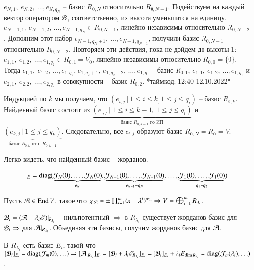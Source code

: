 \documentclass[main]{subfiles}
\begin{document}
$e_{N, 1}, \ e_{N, 2}, \ \ldots, e_{N, q_N}$ -- базис $R_{0, N}$ относительно $R_{0, N-1}$.
Подействуем на каждый вектор оператором $\mathcal{B}$, соответственно, их высота уменьшится на единицу.
$e_{N-1, 1}, \ e_{N-1, 2}, \ \ldots, e_{N-1, q_N} \in R_{0, N-1}$, линейно независимы относительно $ R_{0, N-2}$.
Дополним этот набор $e_{N-1, q_N+1}, \ \ldots, e_{N-1, q_{N-1}}$, получили базис  $R_{0, N-1}$ относительно $R_{0, N-2}$. Повторяем эти действия, пока не дойдем до высоты 1:
$e_{1, 1}, \ e_{1, 2}, \ \ldots, e_{1, q_2} \in R_{0, 1} = V_0$, линейно независимы относительно $ R_{0, 0} = \{0\}$.
Тогда $e_{1, 1}, \ e_{1, 2}, \ \ldots, e_{1, q_2}$, $e_{1, q_2+1}, \ e_{1, q_2+2}, \ \ldots, e_{1, q_1}$ -- базис $R_{0, 1}$,
$e_{1, 1}, \ e_{1, 2}, \ \ldots, e_{1, q_1}$ и $e_{2, 1}, \ e_{2, 2}, \ \ldots, e_{2, q_2}$ в совокупности -- базис $R_{0, 2}$. *таймкод: 12:40 12.10.2022*

Индукцией по $k$ мы получаем, что $(e_{i,j} \  | \ 1 \leq i \leq k_, \ 1 \leq j \leq q_i)$ -- базис $R_{0, k}$.
Найденный базис состоит из $\underbrace{(e_{i,j} \  | \ 1 \leq i \leq k-1, \ 1 \leq j \leq q_i)}_{\textrm{базис $R_{0, k-1}$ по ИП}}$
и $\underbrace{(e_{k,j} \  | \ 1 \leq j \leq q_k)}_{\textrm{базис $R_{0, k}$ отн. $R_{0, k-1}$}}$. Следовательно, все $e_{i,j}$ образуют базис
$R_{0, N} = R_0 = V$.

Легко видеть, что найденный базис -- жорданов.

\begin{gather*}
  [\mcb]_E = \diag(\underbrace{\mathcal{J}_N(0), \ldots, \mathcal{J}_N(0)}_{q_N}, \underbrace{\mathcal{J}_{N-1}(0), \ldots, \mathcal{J}_{N-1}(0)}_{q_{N-1}-q_N}, \ldots, \underbrace{\mathcal{J}_1(0), \ldots, \mathcal{J}_1(0)}_{q_1-q_2})
\end{gather*}

Пусть $\mathcal{A} \in \operatorname{End} V$, такое что  $\chi_{\mathcal{A}} = \pm \prod_{i=1}^m (x-\lambda^i)^{\alpha_{\lambda_i}} \Rightarrow
  V = \bigoplus_{i=1}^m R_{\lambda_i}$.

$\mathcal{B}_i = (\mathcal{A} - \lambda_i\mathscr{E}) |_{R_{\lambda_i}}$ -- нильпотентный $\Rightarrow$ в $R_{\lambda_i}$ существует жорданов базис для $\mathcal{B}_i \Rightarrow$ для $\mathcal{A}|_{R_{\lambda_i}}$.
Объединяя эти базисы, получим жорданов базис для $\mathcal{A}$.

В $R_{\lambda_i}$ есть базис $E_i$, такой что $[\mathcal{B}_i]_{E_i} = \operatorname{diag}(\mathcal{J}_m(0), \ldots) \Rightarrow
  [\mathcal{A}|_{R_{\lambda_i}}]_{E_i} = [\mathcal{B}_i+\lambda_i \mathscr{E}_{R_{\lambda_i}}]_{E_i} =
    [\mathcal{B}_i]_{E_i}+ \lambda_i E_{\dim R_{\lambda_i}} = \operatorname{diag}(\mathcal{J}_m(\lambda_i), \ldots)$.
\end{document}

